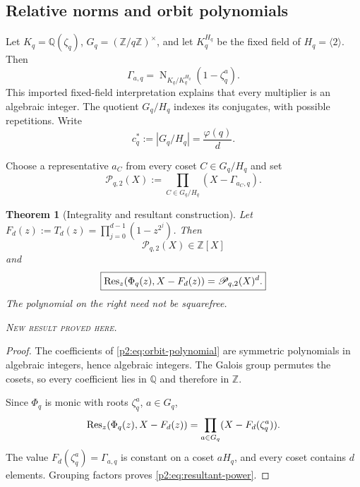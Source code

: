 \documentclass[11pt,oneside]{article}
\newtheorem{theorem}{Theorem}[section]
\theoremstyle{definition}
\theoremstyle{remark}
\newcommand{\Q}{\mathbb Q}
\newcommand{\Z}{\mathbb Z}
\newcommand{\Norm}{\operatorname{N}}
\newcommand{\newresult}{\textcolor{newgreen}{\textsc{New result proved here.}}}
\begin{document}
\subsection{Relative norms and orbit polynomials}

Let $K_q=\Q(\zeta_q)$, $G_q=(\Z/q\Z)^\times$, and let $K_q^{H_q}$ be the fixed
field of $H_q=\langle2\rangle$. Then
\begin{equation}
 \Gamma_{a,q}=\Norm_{K_q/K_q^{H_q}}(1-\zeta_q^a).
 \label{p2:eq:relative-norm}
\end{equation}
This imported fixed-field interpretation explains that every multiplier is an
algebraic integer. The quotient $G_q/H_q$ indexes its conjugates, with possible
repetitions. Write
\begin{equation}
 c_q^*:=|G_q/H_q|=\frac{\varphi(q)}d.
 \label{p2:eq:coset-count}
\end{equation}

\begin{definition}
Choose a representative $a_C$ from every coset $C\in G_q/H_q$ and set
\begin{equation}
 \mathscr P_{q,2}(X):=\prod_{C\in G_q/H_q}(X-\Gamma_{a_C,q}).
 \label{p2:eq:orbit-polynomial}
\end{equation}
\end{definition}

\begin{theorem}[Integrality and resultant construction]\label{p2:thm:orbit-resultant}
Let $F_d(z):=T_d(z)=\prod_{j=0}^{d-1}(1-z^{2^j})$. Then
\begin{equation}
 \mathscr P_{q,2}(X)\in\Z[X]
 \label{p2:eq:orbit-integral}
\end{equation}
and
\begin{equation}
 \boxed{
 \operatorname{Res}_z\!\left(\Phi_q(z),X-F_d(z)\right)=\mathscr P_{q,2}(X)^d.}
 \label{p2:eq:resultant-power}
\end{equation}
The polynomial on the right need not be squarefree.

\smallskip\noindent\newresult
\end{theorem}

\begin{proof}
The coefficients of \eqref{p2:eq:orbit-polynomial} are symmetric polynomials in
algebraic integers, hence algebraic integers. The Galois group permutes the cosets,
so every coefficient lies in $\Q$ and therefore in $\Z$.

Since $\Phi_q$ is monic with roots $\zeta_q^a$, $a\in G_q$,
\[
 \operatorname{Res}_z(\Phi_q(z),X-F_d(z))
 =\prod_{a\in G_q}(X-F_d(\zeta_q^a)).
\]
The value $F_d(\zeta_q^a)=\Gamma_{a,q}$ is constant on a coset $aH_q$, and every
coset contains $d$ elements. Grouping factors proves \eqref{p2:eq:resultant-power}.
\end{proof}
\end{document}
